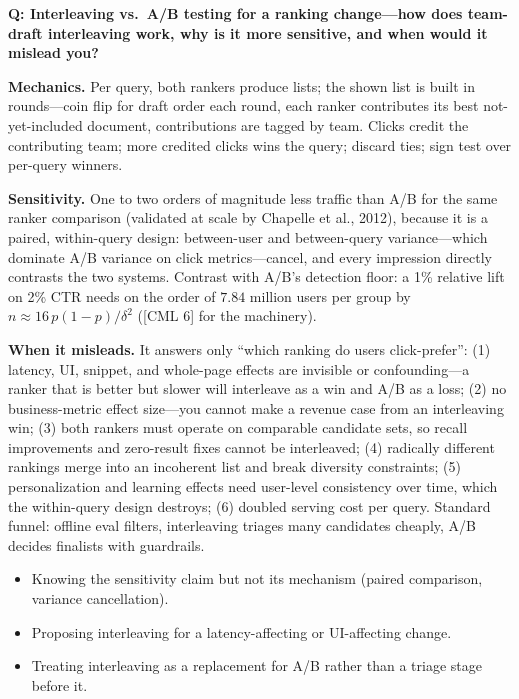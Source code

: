 \begin{interviewq}
\textbf{Q: Interleaving vs.\ A/B testing for a ranking change---how does team-draft interleaving work, why is it more sensitive, and when would it mislead you?}

 \quad {} \quad \badgefreq{\freqmed}

\stronganswer

\textbf{Mechanics.} Per query, both rankers produce lists; the shown list is built in rounds---coin flip for draft order each round, each ranker contributes its best not-yet-included document, contributions are tagged by team. Clicks credit the contributing team; more credited clicks wins the query; discard ties; sign test over per-query winners.

\textbf{Sensitivity.} One to two orders of magnitude less traffic than A/B for the same ranker comparison (validated at scale by Chapelle et al., 2012), because it is a paired, within-query design: between-user and between-query variance---which dominate A/B variance on click metrics---cancel, and every impression directly contrasts the two systems. Contrast with A/B's detection floor: a 1\% relative lift on 2\% CTR needs on the order of $7.84$ million users per group by $n \approx 16\,p(1-p)/\delta^2$ ([CML 6] for the machinery).

\textbf{When it misleads.} It answers only ``which ranking do users click-prefer'': (1) latency, UI, snippet, and whole-page effects are invisible or confounding---a ranker that is better but slower will interleave as a win and A/B as a loss; (2) no business-metric effect size---you cannot make a revenue case from an interleaving win; (3) both rankers must operate on comparable candidate sets, so recall improvements and zero-result fixes cannot be interleaved; (4) radically different rankings merge into an incoherent list and break diversity constraints; (5) personalization and learning effects need user-level consistency over time, which the within-query design destroys; (6) doubled serving cost per query. Standard funnel: offline eval filters, interleaving triages many candidates cheaply, A/B decides finalists with guardrails.

\redflags
\begin{itemize}
    \item Knowing the sensitivity claim but not its mechanism (paired comparison, variance cancellation).
    \item Proposing interleaving for a latency-affecting or UI-affecting change.
    \item Treating interleaving as a replacement for A/B rather than a triage stage before it.
\end{itemize}


\end{interviewq}

